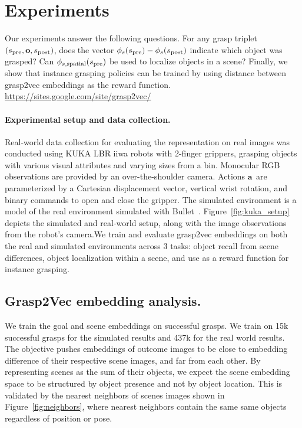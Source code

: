 \documentclass{article}
\begin{document}
\section{Experiments}
\label{sec:experiments}

Our experiments answer the following questions. For any grasp triplet $(s_\text{pre}, \mathbf{o}, s_\text{post})$, does the vector $\phi_s(s_\text{pre}) - \phi_s(s_\text{post})$ indicate which object was grasped? Can $\phi_{s,\text{spatial}}(s_\text{pre})$ be used to localize objects in a scene? Finally, we show that instance grasping policies can be trained by using distance between grasp2vec embeddings as the reward function. \newline
\url{https://sites.google.com/site/grasp2vec/}

\paragraph{Experimental setup and data collection.}
Real-world data collection for evaluating the representation on real images was conducted using KUKA LBR iiwa robots with 2-finger grippers, grasping objects with various visual attributes and varying sizes from a bin.
Monocular RGB observations are provided by an over-the-shoulder camera. Actions $\mathbf{a}$ are parameterized by a Cartesian displacement vector, vertical wrist rotation, and binary commands to open and close the gripper.
The simulated environment is a model of the real environment simulated with Bullet~\cite{bullet}.
Figure~\ref{fig:kuka_setup} depicts the simulated and real-world setup, along with the image observations from the robot's camera.We train and evaluate grasp2vec embeddings on both the real and simulated environments across 3 tasks: object recall from scene differences, object localization within a scene, and use as a reward function for instance grasping.

\subsection{Grasp2Vec embedding analysis.}
We train the goal and scene embeddings on successful grasps. We train on 15k successful grasps for  the simulated results and 437k for the real world results.  The objective pushes embeddings of outcome images to be close to embedding difference of their respective scene images, and far from each other.
By representing scenes as the sum of their objects, we expect the scene embedding space to be structured by object presence and not by object location. This is validated by the nearest neighbors of scenes images shown in Figure~\ref{fig:neighbors}, where nearest neighbors contain the same same objects regardless of position or pose.
\end{document}
